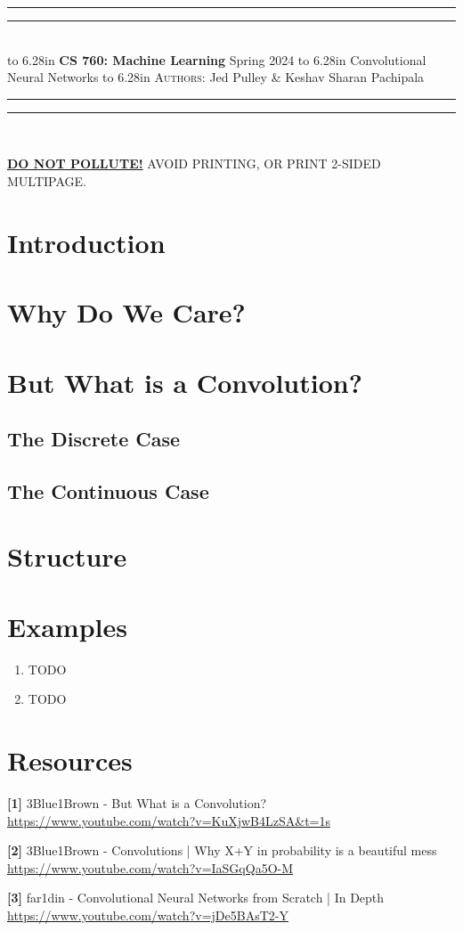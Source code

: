 \documentclass{article}
\newcommand{\lecture}[2]{
\pagestyle{myheadings}
\thispagestyle{plain}
\newpage
\noindent
\begin{center}
\rule{\textwidth}{1.6pt}\vspace*{-\baselineskip}\vspace*{2pt} %
\rule{\textwidth}{0.4pt}\\[1\baselineskip] %
\vbox{\vspace{2mm}
\hbox to 6.28in { {\bf CS 760: Machine Learning} \hfill Spring 2024 }
\vspace{4mm}
\hbox to 6.28in { {\Large \hfill #1  \hfill} }
\vspace{4mm}
\hbox to 6.28in { {\scshape Authors:}  #2 \hfill }}
\vspace{-2mm}
\rule{\textwidth}{0.4pt}\vspace*{-\baselineskip}\vspace{3.2pt} %
\rule{\textwidth}{1.6pt}\\[\baselineskip] %
\end{center}
\vspace*{4mm}
}
\begin{document}
\lecture{Convolutional Neural Networks}{Jed Pulley \& Keshav Sharan Pachipala}

\begin{center}
{\Large {\sf \underline{\textbf{DO NOT POLLUTE!}} AVOID PRINTING, OR PRINT 2-SIDED MULTIPAGE.}}
\end{center}


\section{Introduction}

\section{Why Do We Care?}

\section{But What is a Convolution?}
  \subsection*{The Discrete Case}
  \subsection*{The Continuous Case}

\section{Structure}

\section{Examples}
  \begin{enumerate}[label=(\alph*)]
    \item TODO
    \item TODO
  \end{enumerate}

\section{Resources}
  \textbf{[1]} 3Blue1Brown - But What is a Convolution? \\
  \url{https://www.youtube.com/watch?v=KuXjwB4LzSA&t=1s}

  \textbf{[2]} 3Blue1Brown - Convolutions | Why X+Y in probability is a beautiful mess \\
  \url{https://www.youtube.com/watch?v=IaSGqQa5O-M}

  \textbf{[3]} far1din - Convolutional Neural Networks from Scratch | In Depth \\
  \url{https://www.youtube.com/watch?v=jDe5BAsT2-Y}
\end{document}
